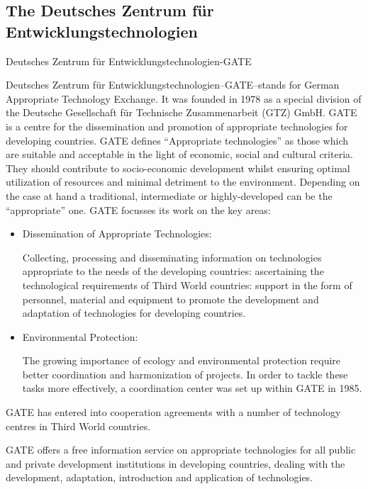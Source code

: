 \subsection*{The Deutsches Zentrum f\"{u}r Entwicklungstechnologien}
Deutsches Zentrum f\"{u}r Entwicklungstechnologien-GATE

Deutsches Zentrum f\"{u}r Entwicklungstechnologien--GATE--stands for German 
Appropriate Technology Exchange. It was founded in 1978 as a special division 
of the Deutsche Gesellschaft f\"{u}r Technische Zusammenarbeit (GTZ) GmbH. GATE 
is a 
centre for the dissemination and promotion of appropriate technologies for 
developing countries. GATE defines ``Appropriate technologies'' as those which 
are suitable and acceptable in the light of economic, social and cultural 
criteria. They should contribute to socio-economic development whilst ensuring 
optimal utilization of resources and minimal detriment to the environment. 
Depending on the case at hand a traditional, intermediate or highly-developed 
can be the ``appropriate'' one. GATE focusses its work on the key areas:
\begin{itemize}
\item Dissemination of Appropriate Technologies: 

Collecting, processing and disseminating information on technologies 
appropriate to the needs of the developing countries: ascertaining the 
technological requirements of Third World countries: support in the form of 
personnel, material and equipment to promote the development and adaptation of 
technologies for developing countries.

\item Environmental Protection:

The growing importance of ecology and environmental protection require better 
coordination and harmonization of projects. In order to tackle these tasks more 
effectively, a coordination center was set up within GATE in 1985.
\end{itemize}
GATE has entered into cooperation agreements with a number of technology 
centres in Third World countries.

GATE offers a free information service on appropriate technologies for all 
public and private development institutions in developing countries, dealing 
with the development, adaptation, introduction and application of technologies.

